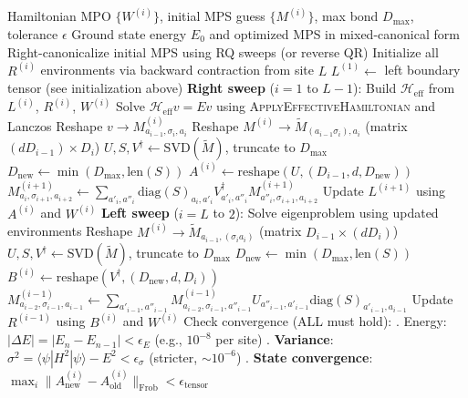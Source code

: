 \documentclass[aps,prb,onecolumn,scriptaddress]{revtex4-2}
\newcommand{\ket}[1]{|#1\rangle}
\newcommand{\bra}[1]{\langle#1|}
\newcommand{\eps}{\epsilon}
\begin{document}
	\begin{algorithm}[H]
		\caption{SingleSiteDMRG (with Gauge Control)}
		\begin{algorithmic}[1]
			\Require Hamiltonian MPO $\{W^{(i)}\}$, initial MPS guess $\{M^{(i)}\}$, max bond $D_{\max}$, tolerance $\eps$
			\Ensure Ground state energy $E_0$ and optimized MPS in mixed-canonical form
			\State Right-canonicalize initial MPS using RQ sweeps (or reverse QR)
			\State Initialize all $R^{(i)}$ environments via backward contraction from site $L$
			\State $L^{(1)} \gets$ left boundary tensor (see initialization above)
			\State \textbf{Right sweep} ($i=1$ to $L-1$):
			\State Build $\mathcal{H}_{\text{eff}}$ from $L^{(i)}$, $R^{(i)}$, $W^{(i)}$
			\State Solve $\mathcal{H}_{\text{eff}} v = E v$ using \textsc{ApplyEffectiveHamiltonian} and Lanczos
			\State Reshape $v \to M^{(i)}_{a_{i-1},\sigma_i,a_i}$
			\State {}
			\State Reshape $M^{(i)} \to \tilde{M}_{(a_{i-1}\sigma_i), a_i}$ (matrix $(dD_{i-1}) \times D_i$)
			\State $U, S, V^\dagger \gets \text{SVD}(\tilde{M})$, truncate to $D_{\max}$
			\State $D_{\text{new}} \gets \min(D_{\max}, \text{len}(S))$
			\State $A^{(i)} \gets \text{reshape}(U, (D_{i-1}, d, D_{\text{new}}))$ 
			\State {}
			\State $M^{(i+1)}_{a_i,\sigma_{i+1},a_{i+2}} \gets \sum_{a'_i, a''_i} \text{diag}(S)_{a_i,a'_i} V^\dagger_{a'_i,a''_i} M^{(i+1)}_{a''_i,\sigma_{i+1},a_{i+2}}$
			\State Update $L^{(i+1)}$ using $A^{(i)}$ and $W^{(i)}$
			\EndFor
			\State \textbf{Left sweep} ($i=L$ to $2$):
			\State Solve eigenproblem using updated environments
			\State Reshape $M^{(i)} \to \tilde{M}_{a_{i-1}, (\sigma_i a_i)}$ (matrix $D_{i-1} \times (dD_i)$)
			\State $U, S, V^\dagger \gets \text{SVD}(\tilde{M})$, truncate to $D_{\max}$
			\State $D_{\text{new}} \gets \min(D_{\max}, \text{len}(S))$
			\State $B^{(i)} \gets \text{reshape}(V^\dagger, (D_{\text{new}}, d, D_i))$ 
			\State {}
			\State $M^{(i-1)}_{a_{i-2},\sigma_{i-1},a_{i-1}} \gets \sum_{a'_{i-1}, a''_{i-1}} M^{(i-1)}_{a_{i-2},\sigma_{i-1},a''_{i-1}} U_{a''_{i-1},a'_{i-1}} \text{diag}(S)_{a'_{i-1},a_{i-1}}$
			\State Update $R^{(i-1)}$ using $B^{(i)}$ and $W^{(i)}$
			\EndFor
			\State Check convergence (ALL must hold):
			\State {}. Energy: $|\Delta E| = |E_n - E_{n-1}| < \eps_E$ (e.g., $10^{-8}$ per site)
			\State {}. \textbf{Variance}: $\sigma^2 = \bra{\psi}H^2\ket{\psi} - E^2 < \eps_{\sigma}$ (stricter, $\sim 10^{-6}$)
			\State {}. \textbf{State convergence}: $\max_i \|A^{(i)}_{\text{new}} - A^{(i)}_{\text{old}}\|_{\text{Frob}} < \eps_{\text{tensor}}$
			\EndWhile
		\end{algorithmic}
	\end{algorithm}
	
\end{document}
